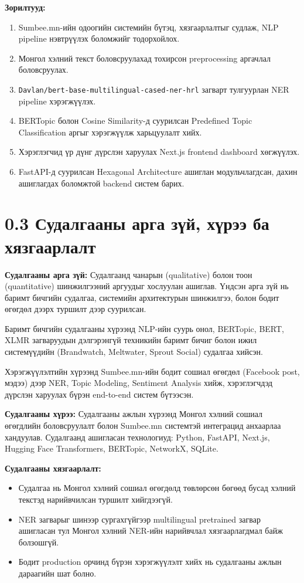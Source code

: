 \noindent\textbf{Зорилтууд:}
\begin{enumerate}
    \item Sumbee.mn-ийн одоогийн системийн бүтэц, хязгаарлалтыг судлаж, NLP pipeline нэвтрүүлэх боломжийг тодорхойлох.
    \item Монгол хэлний текст боловсруулахад тохирсон preprocessing аргачлал боловсруулах.
    \item \texttt{Davlan/bert-base-multilingual-cased-ner-hrl} загварт тулгуурлан NER pipeline хэрэгжүүлэх.
    \item BERTopic болон Cosine Similarity-д суурилсан Predefined Topic Classification аргыг хэрэгжүүлж харьцуулалт хийх.
    \item Хэрэглэгчид үр дүнг дүрслэн харуулах Next.js frontend dashboard хөгжүүлэх.
    \item FastAPI-д суурилсан Hexagonal Architecture ашиглан модульчлагдсан, дахин ашиглагдах боломжтой backend систем барих.
\end{enumerate}

\section*{0.3 Судалгааны арга зүй, хүрээ ба хязгаарлалт}

\textbf{Судалгааны арга зүй:}
Судалгаанд чанарын (qualitative) болон тоон (quantitative) шинжилгээний аргуудыг хослуулан ашиглав. Үндсэн арга зүй нь баримт бичгийн судалгаа, системийн архитектурын шинжилгээ, болон бодит өгөгдөл дээрх туршилт дээр суурилсан.

Баримт бичгийн судалгааны хүрээнд NLP-ийн суурь онол, BERTopic, BERT, XLMR загваруудын дэлгэрэнгүй техникийн баримт бичиг болон ижил системүүдийн (Brandwatch, Meltwater, Sprout Social) судалгаа хийсэн.

Хэрэгжүүлэлтийн хүрээнд Sumbee.mn-ийн бодит сошиал өгөгдөл (Facebook post, мэдээ) дээр NER, Topic Modeling, Sentiment Analysis хийж, хэрэглэгчдэд дүрслэн харуулах бүрэн end-to-end систем бүтээсэн.

\textbf{Судалгааны хүрээ:}
Судалгааны ажлын хүрээнд Монгол хэлний сошиал өгөгдлийн боловсруулалт болон Sumbee.mn системтэй интеграцид анхаарлаа хандуулав. Судалгаанд ашигласан технологиуд: Python, FastAPI, Next.js, Hugging Face Transformers, BERTopic, NetworkX, SQLite.

\textbf{Судалгааны хязгаарлалт:}
\begin{itemize}
    \item Судалгаа нь Монгол хэлний сошиал өгөгдөлд төвлөрсөн бөгөөд бусад хэлний текстэд нарийвчилсан туршилт хийгдээгүй.
    \item NER загварыг шинээр сургахгүйгээр multilingual pretrained загвар ашигласан тул Монгол хэлний NER-ийн нарийвчлал хязгаарлагдмал байж болзошгүй.
    \item Бодит production орчинд бүрэн хэрэгжүүлэлт хийх нь судалгааны ажлын дараагийн шат болно.
\end{itemize}
